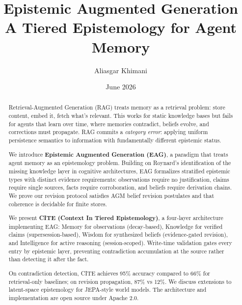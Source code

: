 \documentclass[11pt,a4paper]{article}
\begin{document}
\title{\textbf{Epistemic Augmented Generation}\\
    {\large A Tiered Epistemology for Agent Memory}}

\author[1]{Aliasgar Khimani}

\date{June 2026}

\maketitle

\begin{abstract}
Retrieval-Augmented Generation (RAG) treats memory as a retrieval problem: store content, embed it, fetch what's relevant. This works for static knowledge bases but fails for agents that learn over time, where memories contradict, beliefs evolve, and corrections must propagate. RAG commits a \textit{category error}: applying uniform persistence semantics to information with fundamentally different epistemic status.

We introduce \textbf{Epistemic Augmented Generation (EAG)}, a paradigm that treats agent memory as an epistemology problem. Building on Roynard's identification of the missing knowledge layer in cognitive architectures, EAG formalizes stratified epistemic types with distinct evidence requirements: observations require no justification, claims require single sources, facts require corroboration, and beliefs require derivation chains. We prove our revision protocol satisfies AGM belief revision postulates and that coherence is decidable for finite stores.

We present \textbf{CITE (Context In Tiered Epistemology)}, a four-layer architecture implementing EAG: Memory for observations (decay-based), Knowledge for verified claims (supersession-based), Wisdom for synthesized beliefs (evidence-gated revision), and Intelligence for active reasoning (session-scoped). Write-time validation gates every entry by epistemic layer, preventing contradiction accumulation at the source rather than detecting it after the fact.

On contradiction detection, CITE achieves 95\% accuracy compared to 66\% for retrieval-only baselines; on revision propagation, 87\% vs 12\%. We discuss extensions to latent-space epistemology for JEPA-style world models. The architecture and implementation are open source under Apache 2.0.
\end{abstract}
\end{document}
